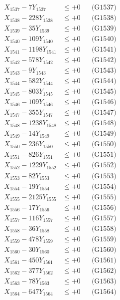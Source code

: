 \documentclass[a4paper,10pt]{article}
\begin{document}
{\begin{align}
X_{1537} - 7Y_{1537} &\leq +0 && \text{(G1537)} \\
X_{1538} - 228Y_{1538} &\leq +0 && \text{(G1538)} \\
X_{1539} - 35Y_{1539} &\leq +0 && \text{(G1539)} \\
X_{1540} - 109Y_{1540} &\leq +0 && \text{(G1540)} \\
\allowbreak
X_{1541} - 1198Y_{1541} &\leq +0 && \text{(G1541)} \\
X_{1542} - 578Y_{1542} &\leq +0 && \text{(G1542)} \\
X_{1543} - 9Y_{1543} &\leq +0 && \text{(G1543)} \\
X_{1544} - 582Y_{1544} &\leq +0 && \text{(G1544)} \\
X_{1545} - 803Y_{1545} &\leq +0 && \text{(G1545)} \\
X_{1546} - 109Y_{1546} &\leq +0 && \text{(G1546)} \\
X_{1547} - 355Y_{1547} &\leq +0 && \text{(G1547)} \\
X_{1548} - 1238Y_{1548} &\leq +0 && \text{(G1548)} \\
X_{1549} - 14Y_{1549} &\leq +0 && \text{(G1549)} \\
X_{1550} - 236Y_{1550} &\leq +0 && \text{(G1550)} \\
\allowbreak
X_{1551} - 826Y_{1551} &\leq +0 && \text{(G1551)} \\
X_{1552} - 1229Y_{1552} &\leq +0 && \text{(G1552)} \\
X_{1553} - 82Y_{1553} &\leq +0 && \text{(G1553)} \\
X_{1554} - 19Y_{1554} &\leq +0 && \text{(G1554)} \\
X_{1555} - 2125Y_{1555} &\leq +0 && \text{(G1555)} \\
X_{1556} - 17Y_{1556} &\leq +0 && \text{(G1556)} \\
X_{1557} - 116Y_{1557} &\leq +0 && \text{(G1557)} \\
X_{1558} - 36Y_{1558} &\leq +0 && \text{(G1558)} \\
X_{1559} - 478Y_{1559} &\leq +0 && \text{(G1559)} \\
X_{1560} - 30Y_{1560} &\leq +0 && \text{(G1560)} \\
\allowbreak
X_{1561} - 450Y_{1561} &\leq +0 && \text{(G1561)} \\
X_{1562} - 377Y_{1562} &\leq +0 && \text{(G1562)} \\
X_{1563} - 78Y_{1563} &\leq +0 && \text{(G1563)} \\
X_{1564} - 647Y_{1564} &\leq +0 && \text{(G1564)} \\

\end{align}}
\end{document}

